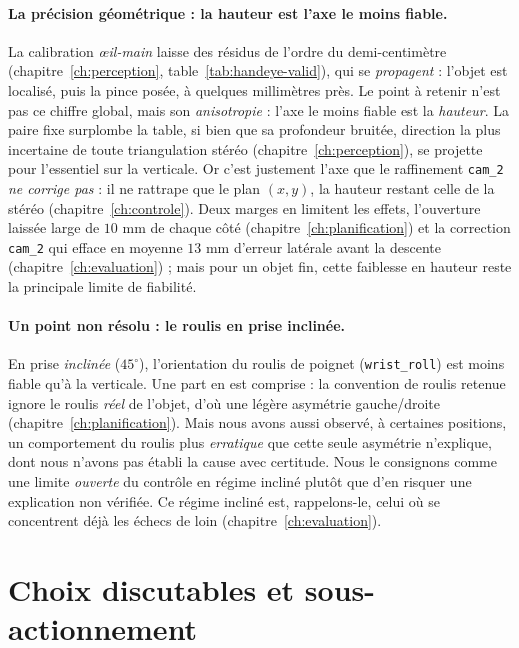 \paragraph{La précision géométrique : la hauteur est l'axe le moins fiable.}
La calibration \emph{{\oe}il-main} laisse des résidus de l'ordre du demi-centimètre (chapitre~\ref{ch:perception}, table~\ref{tab:handeye-valid}), qui se \emph{propagent} : l'objet est localisé, puis la pince posée, à quelques millimètres près. Le point à retenir n'est pas ce chiffre global, mais son \emph{anisotropie} : l'axe le moins fiable est la \emph{hauteur}. La paire fixe surplombe la table, si bien que sa profondeur bruitée, direction la plus incertaine de toute triangulation stéréo (chapitre~\ref{ch:perception}), se projette pour l'essentiel sur la verticale. Or c'est justement l'axe que le raffinement \texttt{cam\_2} \emph{ne corrige pas} : il ne rattrape que le plan $(x, y)$, la hauteur restant celle de la stéréo (chapitre~\ref{ch:controle}). Deux marges en limitent les effets, l'ouverture laissée large de $10$ mm de chaque côté (chapitre~\ref{ch:planification}) et la correction \texttt{cam\_2} qui efface en moyenne $13$ mm d'erreur latérale avant la descente (chapitre~\ref{ch:evaluation}) ; mais pour un objet fin, cette faiblesse en hauteur reste la principale limite de fiabilité.

\paragraph{Un point non résolu : le roulis en prise inclinée.}
En prise \emph{inclinée} ($45^{\circ}$), l'orientation du roulis de poignet (\texttt{wrist\_roll}) est moins fiable qu'à la verticale. Une part en est comprise : la convention de roulis retenue ignore le roulis \emph{réel} de l'objet, d'où une légère asymétrie gauche/droite (chapitre~\ref{ch:planification}). Mais nous avons aussi observé, à certaines positions, un comportement du roulis plus \emph{erratique} que cette seule asymétrie n'explique, dont nous n'avons pas établi la cause avec certitude. Nous le consignons comme une limite \emph{ouverte} du contrôle en régime incliné plutôt que d'en risquer une explication non vérifiée. Ce régime incliné est, rappelons-le, celui où se concentrent déjà les échecs de loin (chapitre~\ref{ch:evaluation}).

\section{Choix discutables et sous-actionnement}
\label{sec:disc-choix}

